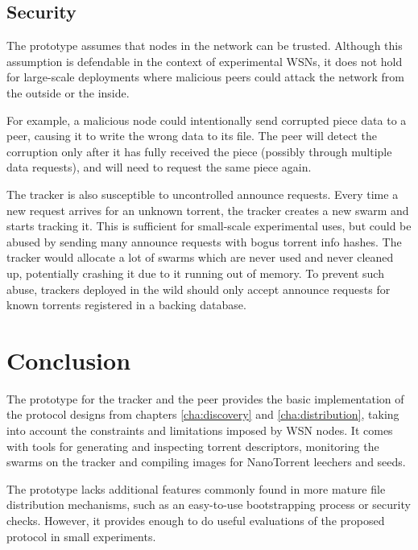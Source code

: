 \subsection{Security}
The prototype assumes that nodes in the network can be trusted. Although this assumption is defendable in the context of experimental \glspl{WSN}, it does not hold for large-scale deployments where malicious peers could attack the network from the outside or the inside.

For example, a malicious node could intentionally send corrupted piece data to a peer, causing it to write the wrong data to its file. The peer will detect the corruption only after it has fully received the piece (possibly through multiple data requests), and will need to request the same piece again.

The tracker is also susceptible to uncontrolled announce requests. Every time a new request arrives for an unknown torrent, the tracker creates a new swarm and starts tracking it. This is sufficient for small-scale experimental uses, but could be abused by sending many announce requests with bogus torrent info hashes. The tracker would allocate a lot of swarms which are never used and never cleaned up, potentially crashing it due to it running out of memory. To prevent such abuse, trackers deployed in the wild should only accept announce requests for known torrents registered in a backing database.

\section{Conclusion}
\label{sec:impl:conclusion}
The prototype for the tracker and the peer provides the basic implementation of the protocol designs from chapters \ref{cha:discovery} and \ref{cha:distribution}, taking into account the constraints and limitations imposed by \gls{WSN} nodes. It comes with tools for generating and inspecting torrent descriptors, monitoring the swarms on the tracker and compiling images for NanoTorrent leechers and seeds.

The prototype lacks additional features commonly found in more mature file distribution mechanisms, such as an easy-to-use bootstrapping process or security checks. However, it provides enough to do useful evaluations of the proposed protocol in small experiments.
